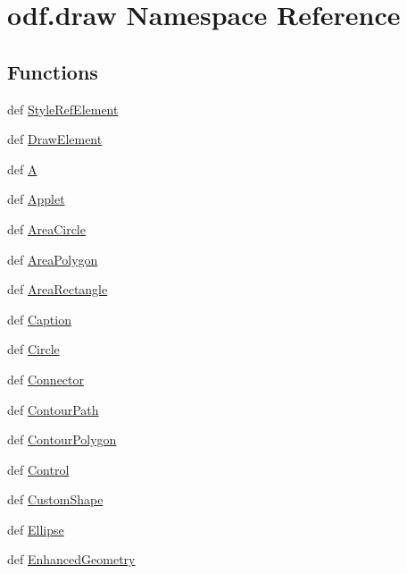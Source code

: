 \hypertarget{namespaceodf_1_1draw}{\section{odf.\+draw Namespace Reference}
\label{namespaceodf_1_1draw}
}
\subsection*{Functions}
\begin{DoxyCompactItemize}
\item 
def \hyperlink{namespaceodf_1_1draw_a3370d99ab01e834591bb75a5869210eb}{Style\+Ref\+Element}
\item 
def \hyperlink{namespaceodf_1_1draw_ad32983860999b41f360b18465324e08e}{Draw\+Element}
\item 
def \hyperlink{namespaceodf_1_1draw_afd937d91013bd4294daea4ea6c654f74}{A}
\item 
def \hyperlink{namespaceodf_1_1draw_aff4b5b20eb72874d3b7c293967279e88}{Applet}
\item 
def \hyperlink{namespaceodf_1_1draw_a3052496223c87d40b76411aaa2170b04}{Area\+Circle}
\item 
def \hyperlink{namespaceodf_1_1draw_a9017e41469d2f0e3f57c27b5616269d1}{Area\+Polygon}
\item 
def \hyperlink{namespaceodf_1_1draw_a98d40da55f425f4529a672ddea027340}{Area\+Rectangle}
\item 
def \hyperlink{namespaceodf_1_1draw_a1fcf417ecc69c5f64a5825f68b356fa1}{Caption}
\item 
def \hyperlink{namespaceodf_1_1draw_ab0956530dc535c6f1776b823113c4bc0}{Circle}
\item 
def \hyperlink{namespaceodf_1_1draw_a092f2cd3049571abdfb5d6a03ab696cc}{Connector}
\item 
def \hyperlink{namespaceodf_1_1draw_a5a7cb81fbf2ab55f193f806f60f7d10a}{Contour\+Path}
\item 
def \hyperlink{namespaceodf_1_1draw_a6e5f52b95848dabe28c08801d01fac76}{Contour\+Polygon}
\item 
def \hyperlink{namespaceodf_1_1draw_a6f3480962e7b3bc1a970d6b33ba44e10}{Control}
\item 
def \hyperlink{namespaceodf_1_1draw_a8302202708fe540f98e9ad352d07cd8d}{Custom\+Shape}
\item 
def \hyperlink{namespaceodf_1_1draw_ac1020dc0376882dee7c4b45a81c659bb}{Ellipse}
\item 
def \hyperlink{namespaceodf_1_1draw_a79fef1410b20220399a8d9532b3f23ab}{Enhanced\+Geometry}

\end{DoxyCompactItemize}
